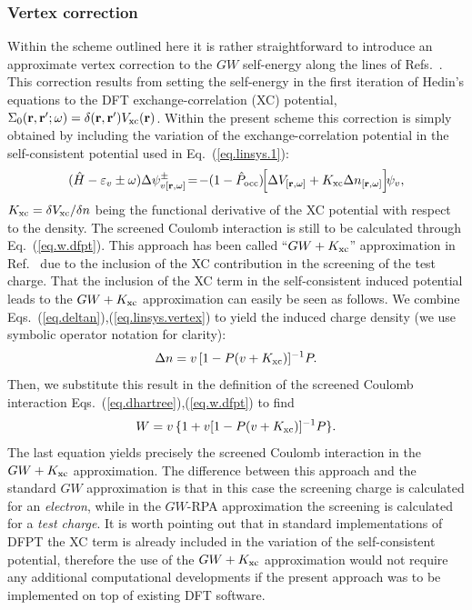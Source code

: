 \documentclass[twocolumn,prb,showpacs,superscriptaddress]{revtex4}
\def\w{\omega}
\def\H{\hat{H}}
\def\P{\hat{P}_{\rm occ}}
\def\E{\varepsilon}
\def\r{{\bf r}}
\def\rp{{\bf r^\prime}}
\begin{document}
\subsubsection{Vertex correction}\label{sec.vertex}

Within the scheme outlined here it is rather straightforward to introduce
an approximate vertex correction to the $GW$ self-energy along the lines 
of Refs.\ . This correction results from setting
the self-energy in the first iteration of Hedin's equations to the DFT
exchange-correlation (XC) potential, $\Sigma_0(\r,\rp;\w) = \delta(\r,\rp) V_{\rm xc}(\r)$.
Within the present scheme this correction is simply obtained by including
the variation of the exchange-correlation
potential in the self-consistent potential used in Eq.\ (\ref{eq.linsys.1}):
  \begin{equation}\label{eq.linsys.vertex}
  (\H-\E_v\pm\w) \Delta \psi^\pm_{v[\r,\w]}\!  = \!-(1-\P)\!  \Big[\Delta V_{[\r,\w]} + K_{\rm xc}\Delta n_{[\r,\w]}\Big] \! \psi_v,
  \end{equation}
$K_{\rm xc}=\delta V_{\rm xc}/\delta n$ being the functional derivative of the XC
potential with respect to the density. The screened Coulomb interaction is still
to be calculated through Eq.~(\ref{eq.w.dfpt}). This approach has been called 
``$GW+K_{\rm xc}$'' approximation in Ref.\  due to the inclusion of the XC contribution
in the screening of the test charge. 
That the inclusion of the XC term in the self-consistent
induced potential leads to the $GW+K_{\rm xc}$ approximation can easily be seen as follows.
We combine Eqs.\ (\ref{eq.deltan}),(\ref{eq.linsys.vertex}) to yield
the induced charge density (we use symbolic operator notation for clarity):
 \begin{equation}
 \Delta n = v\,[1- P (v+K_{\rm xc})]^{-1}P .
 \end{equation}
Then, we substitute this result in the definition of the screened Coulomb interaction
Eqs.\ (\ref{eq.dhartree}),(\ref{eq.w.dfpt}) to find
 \begin{equation}
 W = v \,\{ 1 + v [1-P(v+K_{\rm xc})]^{-1}P \}.
 \end{equation}
The last equation yields precisely the screened Coulomb interaction in the $GW+K_{\rm xc}$ approximation.\cite{hl86,reining94}
The difference between this approach and the
standard $GW$ approximation is that in this case the screening
charge is calculated for an {\it electron}, while in the $GW$-RPA approximation
the screening is calculated for a {\it test charge}.
It is worth pointing out that in standard implementations of DFPT the
XC term is already included in the variation of the self-consistent potential,\cite{baroni.rmp}
therefore the use of the $GW+K_{\rm xc}$ approximation would not require any additional
computational developments if the 
present approach was to be implemented on top of existing DFT software.
\end{document}
